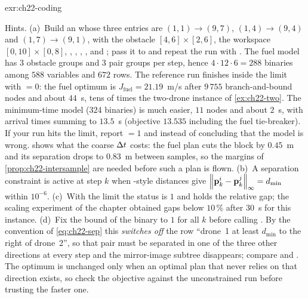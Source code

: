 \begin{solution}{exr:ch22-coding}
\begin{sloppypar}
Hints. (a)~Build an  whose three  entries are
$(1,1) \to (9,7)$, $(1,4) \to (9,4)$ and $(1,7) \to (9,1)$, with the
obstacle $[4,6] \times [2,6]$, the workspace $[0,10] \times [0,8]$,
, , , ,
 and ; pass it to
 and repeat the run with
. The fuel model
has $3$ obstacle groups and $3$ pair groups per step, hence $4 \cdot 12
\cdot 6 = 288$ binaries among $588$ variables and $672$ rows. The reference
run finishes inside the limit with  $= 0$: the fuel
optimum is $J_{\mathrm{fuel}} = 21.19$~m/s after $9\,755$ branch-and-bound
nodes and about $44$~s, tens of times the two-drone instance of
\cref{ex:ch22-two}. The minimum-time model ($324$ binaries) is much easier,
$11$ nodes and about $2$~s, with arrival times summing to $13.5$~s
(objective $13.535$ including the fuel tie-breaker). If your run hits the
limit, report  $= 1$ and  instead of
concluding that the model is wrong.  shows what the
coarse $\Delta t$ costs: the fuel plan cuts the block by $0.45$~m and its
separation drops to $0.83$~m between samples, so the margins of
\cref{prop:ch22-intersample} are needed before such a plan is flown. (b)~A separation constraint is active at step $k$ when
-style distances give $\left\lVert \mathbf{p}^i_k -
\mathbf{p}^j_k \right\rVert_\infty = d_{\min}$ within $10^{-6}$. (c)~With the limit the
status is $1$ and  holds the relative gap; the scaling
experiment of the chapter obtained gaps below $10\,\%$ after $30$~s for
this instance. (d)~Fix the bound of the binary
 to $1$ for all $k$ before calling
. By the convention of \cref{eq:ch22-sep} this
\emph{switches off} the row ``drone~1 at least $d_{\min}$ to the right of
drone~2'', so that pair must be separated in one of the three other
directions at every step and the mirror-image subtree disappears; compare
 and . The optimum is unchanged only
when an optimal plan that never relies on that direction exists, so check
the objective against the unconstrained run before trusting the faster
one.
\end{sloppypar}
\end{solution}
